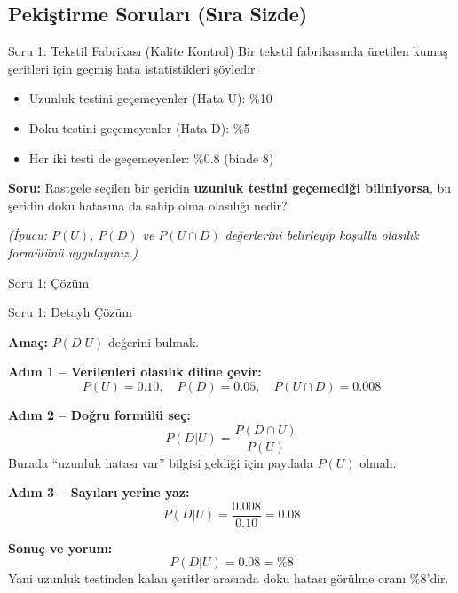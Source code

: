 \documentclass[light]{lutbeamer}
\begin{document}
\subsection{Pekiştirme Soruları (Sıra Sizde)}

\begin{frame}{Soru 1: Tekstil Fabrikası (Kalite Kontrol)}
    Bir tekstil fabrikasında üretilen kumaş şeritleri için geçmiş hata istatistikleri şöyledir:
    \begin{itemize}
        \item Uzunluk testini geçemeyenler (Hata U): \%10
        \item Doku testini geçemeyenler (Hata D): \%5
        \item Her iki testi de geçemeyenler: \%0.8 (binde 8)
    \end{itemize}
    
    \vspace{0.3cm}
    \textbf{Soru:} Rastgele seçilen bir şeridin \textbf{uzunluk testini geçemediği biliniyorsa}, bu şeridin doku hatasına da sahip olma olasılığı nedir?
    
    \vspace{0.2cm}
    \textit{(İpucu: $P(U)$, $P(D)$ ve $P(U \cap D)$ değerlerini belirleyip koşullu olasılık formülünü uygulayınız.)}
\end{frame}

\begin{frame}{Soru 1: Çözüm}
    \vspace{5cm} %
\end{frame}

\begin{frame}[allowframebreaks]{Soru 1: Detaylı Çözüm}
    \scriptsize
    {\color{red}
    \textbf{Amaç:} $P(D|U)$ değerini bulmak.
    
    \vspace{0.15cm}
    \textbf{Adım 1 -- Verilenleri olasılık diline çevir:}
    \[
    P(U)=0.10,\quad P(D)=0.05,\quad P(U\cap D)=0.008
    \]
    
    \vspace{0.1cm}
    \textbf{Adım 2 -- Doğru formülü seç:}
    \[
    P(D|U)=\frac{P(D\cap U)}{P(U)}
    \]
    Burada ``uzunluk hatası var'' bilgisi geldiği için paydada $P(U)$ olmalı.
    
    \vspace{0.1cm}
    \textbf{Adım 3 -- Sayıları yerine yaz:}
    \[
    P(D|U)=\frac{0.008}{0.10}=0.08
    \]
    
    \vspace{0.1cm}
    \textbf{Sonuç ve yorum:}
    \[
    \boxed{P(D|U)=0.08= \%8}
    \]
    Yani uzunluk testinden kalan şeritler arasında doku hatası görülme oranı \%8'dir.
    }
\end{frame}
\end{document}
